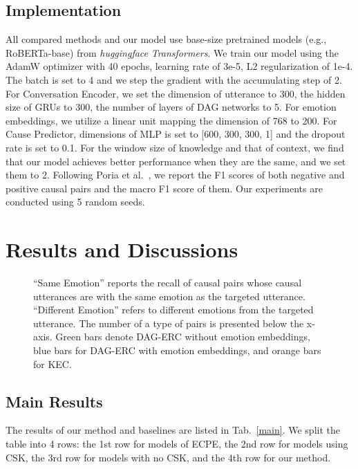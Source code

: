 \documentclass{article}
\begin{document}
\subsection{Implementation}

All compared methods and our model use base-size pretrained models (e.g., RoBERTa-base) from \textit{huggingface} \textit{Transformers}. We train our model using the AdamW optimizer with 40 epochs, learning rate of 3e-5, L2 regularization of 1e-4. The batch is set to 4 and we step the gradient with the accumulating step of 2. For Conversation Encoder, we set the dimension of utterance to 300, the hidden size of GRUs to 300, the number of layers of DAG networks to 5. For emotion embeddings, we utilize a linear unit mapping the dimension of 768 to 200. For Cause Predictor, dimensions of MLP is set to [600, 300, 300, 1] and the dropout rate is set to 0.1. For the window size of knowledge and that of context, we find that our model achieves better performance when they are the same, and we set them to 2.  Following Poria et al.~, we report the F1 scores of both negative and positive causal pairs and the macro F1 score of them. Our experiments are conducted using 5 random seeds.

\section{Results and Discussions}

\begin{figure*}
    \centering
    \caption{``Same Emotion'' reports the recall of causal pairs whose causal utterances are with the same emotion as the targeted utterance. ``Different Emotion'' refers to different emotions from the targeted utterance. The number of a type of pairs is presented below the x-axis. Green bars denote DAG-ERC without emotion embeddings, blue bars for DAG-ERC with emotion embeddings, and orange bars for KEC. }
    \vspace{-0.1cm}
    \label{emotion}
\end{figure*}

\subsection{Main Results}

The results of our method and baselines are listed in Tab.~\ref{main}. We split the table into 4 rows: the 1st row for models of ECPE, the 2nd row for models using CSK, the 3rd row for models with no CSK, and the 4th row for our method. 
\end{document}

